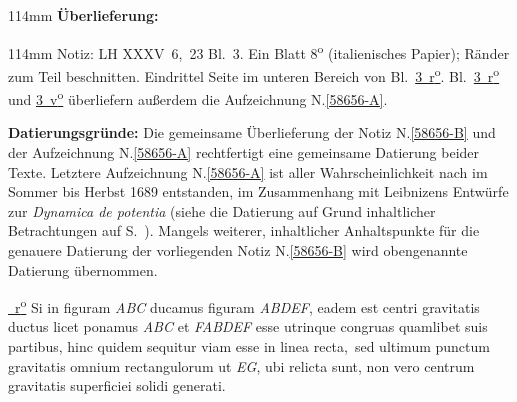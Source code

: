 \frenchspacing
\begin{ledgroupsized}[r]{114mm}
\footnotesize
\pstart
\noindent
\textbf{Überlieferung:}
\pend
\end{ledgroupsized}
\begin{ledgroupsized}[r]{114mm}
\footnotesize
\pstart
\parindent -6mm
%
Notiz:
LH XXXV~6,~23 Bl.~3.
Ein Blatt 8\textsuperscript{o} (italienisches Papier);
Ränder zum Teil beschnitten.
Eindrittel Seite im unteren Bereich von Bl.~\href{\Scan{LH_35_06_23_003r}}{3~r\textsuperscript{o}}.
Bl.~\href{\Scan{LH_35_06_23_003r}}{3~r\textsuperscript{o}} und \href{\Scan{LH_35_06_23_003v}}{3~v\textsuperscript{o}} überliefern außerdem die Aufzeichnung N.\;\ref{58656-A}.
\pend
\end{ledgroupsized}
\vspace{5mm}
\begin{ledgroup}
\footnotesize
\pstart
\noindent
\textbf{Datierungsgründe:}
Die gemeinsame Überlieferung der Notiz N.\;\ref{58656-B} und der Aufzeichnung N.\;\ref{58656-A} rechtfertigt eine gemeinsame Datierung beider Texte. 
Letztere Aufzeichnung N.\;\ref{58656-A} ist aller Wahrscheinlichkeit nach im Sommer bis Herbst 1689 entstanden, im Zusammenhang mit Leibnizens Entwürfe zur \cite{01354}\textit{Dynamica de potentia} (siehe die Datierung auf Grund inhaltlicher Betrachtungen auf S.~\pageref{58656-A_dat}).
Mangels weiterer, inhaltlicher Anhaltspunkte für die genauere Datierung der vorliegenden Notiz N.\;\ref{58656-B} wird obengenannte Datierung übernommen.
\pend
\end{ledgroup}
\vspace{8mm}
\pstart
\noindent
\href{\Scan{LH_35_06_23_003r}}%
{~r\textsuperscript{o}\rbrack}
Si in figuram \textit{ABC} ducamus figuram \textit{ABDEF}, eadem est 
centri gravitatis ductus
licet ponamus \textit{ABC} et \textit{FABDEF} esse utrinque congruas quamlibet suis partibus,
hinc quidem sequitur viam esse in linea recta\lbrack,\rbrack\ sed ultimum punctum
gravitatis omnium rectangulorum ut \textit{EG}, ubi relicta sunt, non vero centrum gravitatis
superficiei solidi generati.
\pend

